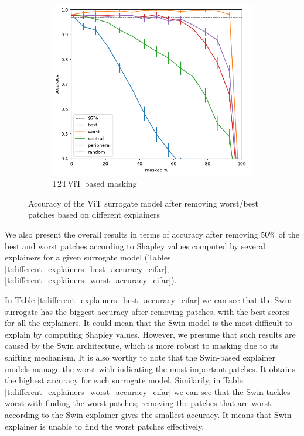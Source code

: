 \documentclass[magisterska,en]{pracamgr}
\begin{document}
\begin{figure}
\begin{subfigure}{.5\textwidth}
  \centering
  \includegraphics[width=1\linewidth]{./images/v_on_v_metrics.png}
  \caption{T2T\textunderscore ViT based masking }
\end{subfigure}


\caption{Accuracy of the ViT surrogate model after removing worst/best patches based on different explainers}
\label{fig:Different explainers metrics}
\end{figure}



We also present the overall results in terms of accuracy after removing 50\% of the best and worst patches according to Shapley values computed by several explainers for a given surrogate model (Tables \ref{t:different_explainers_best_accuracy_cifar}, \ref{t:different_explainers_worst_accuracy_cifar}).

In Table  \ref{t:different_explainers_best_accuracy_cifar} we can see that the Swin surrogate has the biggest accuracy after removing patches, with the best scores for all the explainers. It could mean that the Swin model is the most difficult to explain by computing Shapley values. However, we presume that such results are caused by the Swin architecture, which is more robust to masking due to its shifting mechanism. It is also worthy to note that the Swin-based explainer models manage the worst with indicating the most important patches. It obtains the highest accuracy for each surrogate model. Similarily, in Table  \ref{t:different_explainers_worst_accuracy_cifar} we can see that the Swin tackles worst with finding the worst patches; removing the patches that are worst according to the Swin explainer gives the smallest accuracy. It means that Swin explainer is unable to find the worst patches effectively.
\end{document}
